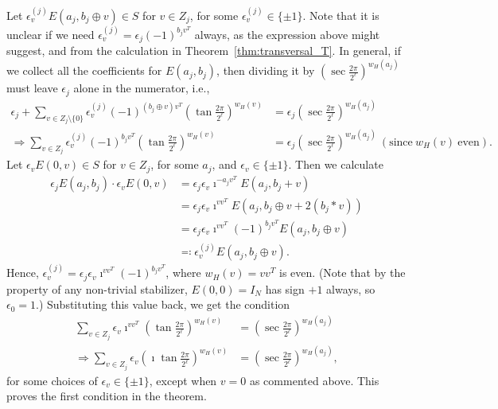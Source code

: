 \documentclass[twoside,romanappendices]{IEEEtran}
\begin{document}
Let $\epsilon_v^{(j)} E(a_j, b_j \oplus v) \in S$ for $v \in Z_j$, for some $\epsilon_v^{(j)} \in \{ \pm 1 \}$.
Note that it is unclear if we need $\epsilon_v^{(j)} = \epsilon_j (-1)^{b_j v^T}$ always, as the expression above might suggest, and from the calculation in Theorem~\ref{thm:transversal_T}.
In general, if we collect all the coefficients for $E(a_j,b_j)$, then dividing it by $\left( \sec\frac{2\pi}{2^\ell} \right)^{w_H(a_j)}$ must leave $\epsilon_j$ alone in the numerator, i.e.,
\begin{align}
\epsilon_j + \sum_{v \in Z_j \setminus \{0\}} \epsilon_v^{(j)} (-1)^{(b_j \oplus v) v^T} \left( \tan\frac{2\pi}{2^\ell} \right)^{w_H(v)} & = \epsilon_j \left( \sec\frac{2\pi}{2^\ell} \right)^{w_H(a_j)} \\
%
\Rightarrow \sum_{v \in Z_j} \epsilon_v^{(j)} (-1)^{b_j v^T} \left( \tan\frac{2\pi}{2^\ell} \right)^{w_H(v)} & = \epsilon_j \left( \sec\frac{2\pi}{2^\ell} \right)^{w_H(a_j)} \ (\text{since}\ w_H(v)\ \text{even}).
\end{align}
Let $\epsilon_v E(0,v) \in S$ for $v \in Z_j$, for some $a_j$, and $\epsilon_v \in \{ \pm 1 \}$.
Then we calculate
\begin{align}
\epsilon_j E(a_j,b_j) \cdot \epsilon_v E(0,v) & = \epsilon_j \epsilon_v \imath^{-a_j v^T} E(a_j, b_j + v) \\
%
   & = \epsilon_j \epsilon_v \imath^{vv^T} E(a_j, b_j \oplus v + 2(b_j \ast v)) \\
   & = \epsilon_j \epsilon_v \imath^{vv^T} (-1)^{b_j v^T} E(a_j, b_j \oplus v) \\
   & \eqqcolon \epsilon_v^{(j)} E(a_j, b_j \oplus v).
\end{align}
Hence, $\epsilon_v^{(j)} = \epsilon_j \epsilon_v \imath^{vv^T} (-1)^{b_j v^T}$, where $w_H(v) = vv^T$ is even.
(Note that by the property of any non-trivial stabilizer, $E(0,0) = I_N$ has sign $+1$ always, so $\epsilon_0 = 1$.)
Substituting this value back, we get the condition
\begin{align}
\sum_{v \in Z_j} \epsilon_v \imath^{vv^T} \left( \tan\frac{2\pi}{2^\ell} \right)^{w_H(v)} & = \left( \sec\frac{2\pi}{2^\ell} \right)^{w_H(a_j)} \\
%
\Rightarrow \sum_{v \in Z_j} \epsilon_v \left( \imath \tan\frac{2\pi}{2^\ell} \right)^{w_H(v)} & = \left( \sec\frac{2\pi}{2^\ell} \right)^{w_H(a_j)},
\end{align}
for some choices of $\epsilon_v \in \{ \pm 1 \}$, except when $v = 0$ as commented above.
This proves the first condition in the theorem.
\end{document}
